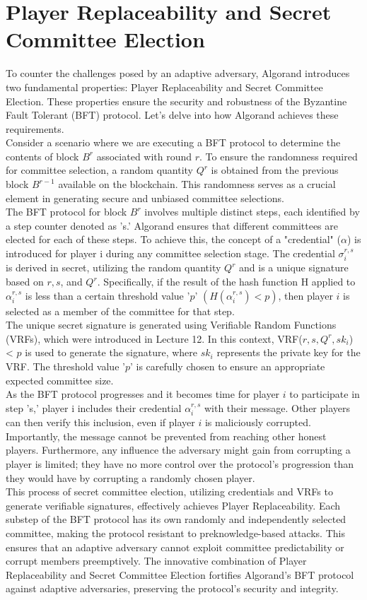 \documentclass{report}
\begin{document}
\section{Player Replaceability and Secret Committee Election}
To counter the challenges posed by an adaptive adversary, Algorand introduces two fundamental properties: Player Replaceability and Secret Committee Election. These properties ensure the security and robustness of the Byzantine Fault Tolerant (BFT) protocol. Let's delve into how Algorand achieves these requirements.\\
Consider a scenario where we are executing a BFT protocol to determine the contents of block $B^{r}$ associated with round $r$. To ensure the randomness required for committee selection, a random quantity $Q^{r}$ is obtained from the previous block $B^{r-1}$ available on the blockchain. This randomness serves as a crucial element in generating secure and unbiased committee selections.\\
The BFT protocol for block $B^{r}$ involves multiple distinct steps, each identified by a step counter denoted as 's.' Algorand ensures that different committees are elected for each of these steps. To achieve this, the concept of a "credential" ($\alpha$) is introduced for player i during any committee selection stage. The credential $σ_{i}^{r, s}$ is derived in secret, utilizing the random quantity $Q^{r}$ and is a unique signature based on $r, s$, and $Q^{r}$. Specifically, if the result of the hash function H applied to $\alpha_{i}^{r, s}$ is less than a certain threshold value '$p$' $(H(\alpha_{i}^{r, s}) < p)$, then player $i$ is selected as a member of the committee for that step.\\
The unique secret signature is generated using Verifiable Random Functions (VRFs), which were introduced in Lecture 12. In this context, VRF($r, s, Q^{r}, sk_{i}$) < $p$ is used to generate the signature, where $sk_{i}$ represents the private key for the VRF. The threshold value '$p$' is carefully chosen to ensure an appropriate expected committee size.\\
As the BFT protocol progresses and it becomes time for player $i$ to participate in step 's,' player i includes their credential $\alpha_{i}^{r, s}$ with their message. Other players can then verify this inclusion, even if player $i$ is maliciously corrupted. Importantly, the message cannot be prevented from reaching other honest players. Furthermore, any influence the adversary might gain from corrupting a player is limited; they have no more control over the protocol's progression than they would have by corrupting a randomly chosen player.\\
This process of secret committee election, utilizing credentials and VRFs to generate verifiable signatures, effectively achieves Player Replaceability. Each substep of the BFT protocol has its own randomly and independently selected committee, making the protocol resistant to preknowledge-based attacks. This ensures that an adaptive adversary cannot exploit committee predictability or corrupt members preemptively. The innovative combination of Player Replaceability and Secret Committee Election fortifies Algorand's BFT protocol against adaptive adversaries, preserving the protocol's security and integrity.
\end{document}
